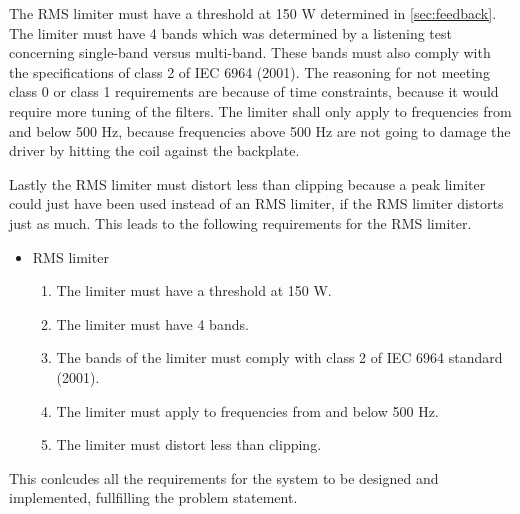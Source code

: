 The RMS limiter must have a threshold at 150 W determined in \autoref{sec:feedback}. The limiter must have 4 bands which was determined by a listening test concerning single-band versus multi-band. These bands must also comply with the specifications of class 2 of IEC 6964 (2001). The reasoning for not meeting class 0 or class 1 requirements are because of time constraints, because it would require more tuning of the filters. The limiter shall only apply to frequencies from and below 500 Hz, because frequencies above 500 Hz are not going to damage the driver by hitting the coil against the backplate. 

Lastly the RMS limiter must distort less than clipping because a peak limiter could just have been used instead of an RMS limiter, if the RMS limiter distorts just as much. This leads to the following requirements for the RMS limiter.     

\begin{itemize}
\item RMS limiter
\begin{enumerate}
\item [\textlabel{10}{Threshold}] The limiter must have a threshold at 150 W.\\
\item [\textlabel{11}{bands}] The limiter must have 4 bands.\\
\item [\textlabel{12}{standardband}] The bands of the limiter must comply with class 2 of IEC 6964 standard (2001).\\
\item [\textlabel{13}{500below}] The limiter must apply to frequencies from and below 500 Hz.\\
\item [\textlabel{14}{clipping}] The limiter must distort less than clipping.
\end{enumerate}
\end{itemize}

This conlcudes all the requirements for the system to be designed and implemented, fullfilling the problem statement. 


